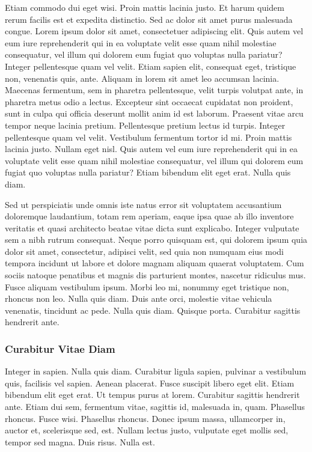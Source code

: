 \documentclass[english,master,dept460,male,cpp,cpdeclaration]{diploma}
\begin{document}
Etiam commodo dui eget wisi. Proin mattis lacinia justo. Et harum quidem rerum facilis est et expedita distinctio. Sed ac dolor sit amet purus malesuada congue. Lorem ipsum dolor sit amet, consectetuer adipiscing elit. Quis autem vel eum iure reprehenderit qui in ea voluptate velit esse quam nihil molestiae consequatur, vel illum qui dolorem eum fugiat quo voluptas nulla pariatur? Integer pellentesque quam vel velit. Etiam sapien elit, consequat eget, tristique non, venenatis quis, ante. Aliquam in lorem sit amet leo accumsan lacinia. Maecenas fermentum, sem in pharetra pellentesque, velit turpis volutpat ante, in pharetra metus odio a lectus. Excepteur sint occaecat cupidatat non proident, sunt in culpa qui officia deserunt mollit anim id est laborum. Praesent vitae arcu tempor neque lacinia pretium. Pellentesque pretium lectus id turpis. Integer pellentesque quam vel velit. Vestibulum fermentum tortor id mi. Proin mattis lacinia justo. Nullam eget nisl. Quis autem vel eum iure reprehenderit qui in ea voluptate velit esse quam nihil molestiae consequatur, vel illum qui dolorem eum fugiat quo voluptas nulla pariatur? Etiam bibendum elit eget erat. Nulla quis diam.

Sed ut perspiciatis unde omnis iste natus error sit voluptatem accusantium doloremque laudantium, totam rem aperiam, eaque ipsa quae ab illo inventore veritatis et quasi architecto beatae vitae dicta sunt explicabo. Integer vulputate sem a nibh rutrum consequat. Neque porro quisquam est, qui dolorem ipsum quia dolor sit amet, consectetur, adipisci velit, sed quia non numquam eius modi tempora incidunt ut labore et dolore magnam aliquam quaerat voluptatem. Cum sociis natoque penatibus et magnis dis parturient montes, nascetur ridiculus mus. Fusce aliquam vestibulum ipsum. Morbi leo mi, nonummy eget tristique non, rhoncus non leo. Nulla quis diam. Duis ante orci, molestie vitae vehicula venenatis, tincidunt ac pede. Nulla quis diam. Quisque porta. Curabitur sagittis hendrerit ante.

\subsubsection{Curabitur Vitae Diam}
Integer in sapien. Nulla quis diam. Curabitur ligula sapien, pulvinar a vestibulum quis, facilisis vel sapien. Aenean placerat. Fusce suscipit libero eget elit. Etiam bibendum elit eget erat. Ut tempus purus at lorem. Curabitur sagittis hendrerit ante. Etiam dui sem, fermentum vitae, sagittis id, malesuada in, quam. Phasellus rhoncus. Fusce wisi. Phasellus rhoncus. Donec ipsum massa, ullamcorper in, auctor et, scelerisque sed, est. Nullam lectus justo, vulputate eget mollis sed, tempor sed magna. Duis risus. Nulla est.
\end{document}
